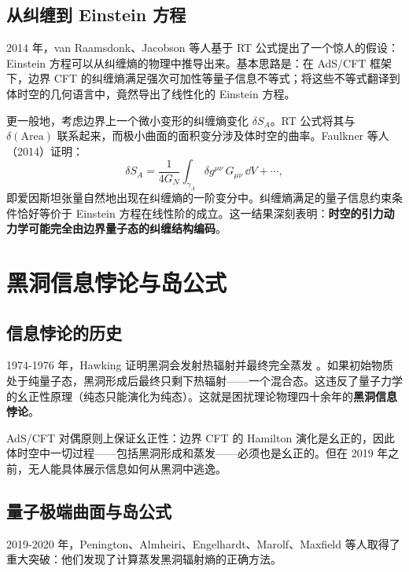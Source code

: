 \subsection{从纠缠到 Einstein 方程}

2014 年，van Raamsdonk、Jacobson 等人基于 RT 公式提出了一个惊人的假设：Einstein 方程可以从纠缠熵的物理中推导出来。基本思路是：在 AdS/CFT 框架下，边界 CFT 的纠缠熵满足强次可加性等量子信息不等式；将这些不等式翻译到体时空的几何语言中，竟然导出了线性化的 Einstein 方程。

更一般地，考虑边界上一个微小变形的纠缠熵变化 $\delta S_A$。RT 公式将其与 $\delta(\text{Area})$ 联系起来，而极小曲面的面积变分涉及体时空的曲率。Faulkner 等人（2014）证明：
\begin{equation}
    \delta S_A = \frac{1}{4G_N} \int_{\gamma_A} \delta g^{\mu\nu} \, G_{\mu\nu} \, \dd V + \cdots,
\end{equation}
即爱因斯坦张量自然地出现在纠缠熵的一阶变分中。纠缠熵满足的量子信息约束条件恰好等价于 Einstein 方程在线性阶的成立。这一结果深刻表明：\textbf{时空的引力动力学可能完全由边界量子态的纠缠结构编码}。

\section{黑洞信息悖论与岛公式}

\subsection{信息悖论的历史}

1974-1976 年，Hawking 证明黑洞会发射热辐射并最终完全蒸发 \cite{Hawking1974}。如果初始物质处于纯量子态，黑洞形成后最终只剩下热辐射——一个混合态。这违反了量子力学的幺正性原理（纯态只能演化为纯态）。这就是困扰理论物理四十余年的\textbf{黑洞信息悖论}。

AdS/CFT 对偶原则上保证幺正性：边界 CFT 的 Hamilton 演化是幺正的，因此体时空中一切过程——包括黑洞形成和蒸发——必须也是幺正的。但在 2019 年之前，无人能具体展示信息如何从黑洞中逃逸。

\subsection{量子极端曲面与岛公式}

2019-2020 年，Penington、Almheiri、Engelhardt、Marolf、Maxfield 等人取得了重大突破：他们发现了计算蒸发黑洞辐射熵的正确方法。


